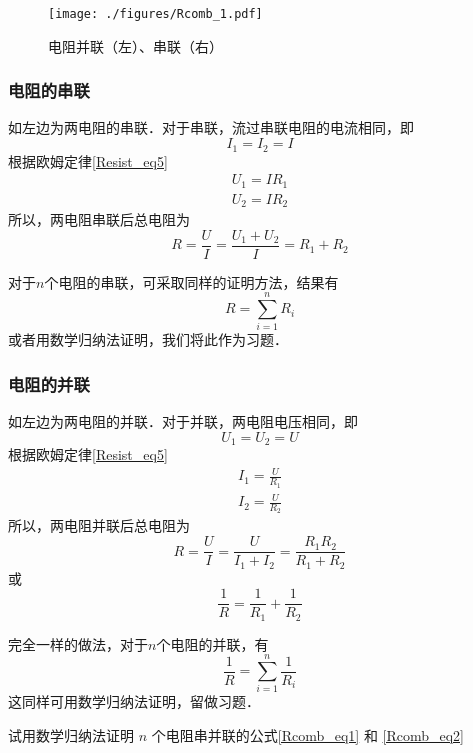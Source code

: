 
\begin{figure}[ht]
\centering
\texttt{[image: ./figures/Rcomb\_1.pdf]}
\caption{电阻并联（左）、串联（右）} \label{Rcomb_fig1}
\end{figure}
\subsubsection{电阻的串联}
如左边为两电阻的串联．对于串联，流过串联电阻的电流相同，即
\begin{equation}
I_1=I_2=I
\end{equation}
根据欧姆定律\autoref{Resist_eq5}~
\begin{equation}
\begin{aligned}
U_1=IR_1\\
U_2=IR_2
\end{aligned}
\end{equation}
所以，两电阻串联后总电阻为
\begin{equation}
R = \frac{U}{I}=\frac{U_1+U_2}{I} = {R_1 + R_2}
\end{equation}

对于$n$个电阻的串联，可采取同样的证明方法，结果有
\begin{equation}\label{Rcomb_eq1}
R=\sum_{i=1}^{n}R_i
\end{equation}
或者用数学归纳法证明，我们将此作为习题．
\subsubsection{电阻的并联}
如左边为两电阻的并联．对于并联，两电阻电压相同，即
\begin{equation}
U_1=U_2=U
\end{equation}
根据欧姆定律\autoref{Resist_eq5}~
\begin{equation}
\begin{aligned}
I_1=\frac{U}{R_1}\\
I_2=\frac{U}{R_2}
\end{aligned}
\end{equation}
所以，两电阻并联后总电阻为
\begin{equation}
R = \frac{U}{I}=\frac{U}{I_1+I_2} =\frac{R_1R_2} {R_1 + R_2}
\end{equation}
或
\begin{equation}
\frac{1}{R} = \frac{1} {R_1}+\frac{1}{R_2}
\end{equation}

完全一样的做法，对于$n$个电阻的并联，有
\begin{equation}\label{Rcomb_eq2}
\frac{1}{R}=\sum_{i=1}^{n}\frac{1}{R_i}
\end{equation}
这同样可用数学归纳法证明，留做习题．
\begin{exercise}{}
试用数学归纳法证明 $n$ 个电阻串并联的公式\autoref{Rcomb_eq1} 和 \autoref{Rcomb_eq2} 
\end{exercise}